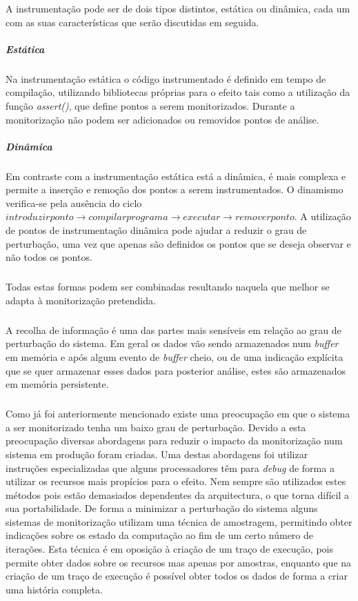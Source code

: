 \begin{itemize}
A instrumentação pode ser de dois tipos distintos, estática ou dinâmica, cada um com as suas características que serão discutidas em seguida.

\subparagraph*{Estática}

Na instrumentação estática o código instrumentado é definido em tempo de compilação, utilizando bibliotecas próprias para o efeito tais como a utilização da função \textit{assert()}, que define pontos a serem monitorizados. Durante a monitorização não podem ser adicionados ou removidos pontos de análise.

\subparagraph*{Dinâmica}

Em contraste com a instrumentação estática está a dinâmica, é mais complexa e permite a inserção e remoção dos pontos a serem instrumentados. O dinamismo verifica-se pela ausência do ciclo $introduzir ponto\rightarrow compilar programa\rightarrow executar\rightarrow remover ponto$. A utilização de pontos de instrumentação dinâmica pode ajudar a reduzir o grau de perturbação, uma vez que apenas são definidos os pontos que se deseja observar e não todos os pontos.
\end{itemize}
\subparagraph*{}
Todas estas formas podem ser combinadas resultando naquela que melhor se adapta à monitorização pretendida.

\subparagraph*{
}
A recolha de informação é uma das partes mais sensíveis em relação ao grau de perturbação do sistema. Em geral os dados vão sendo armazenados num \textit{buffer} em memória e após algum evento de \textit{buffer} cheio, ou de uma indicação explícita que se quer armazenar esses dados para posterior análise, estes são armazenados em memória persistente. 

\subparagraph*{
}
Como já foi anteriormente mencionado existe uma preocupação em que o sistema a ser monitorizado tenha um baixo grau de perturbação. Devido a esta preocupação diversas abordagens para reduzir o impacto da monitorização num sistema em produção foram criadas.
Uma destas abordagens foi utilizar instruções especializadas que alguns processadores têm para \textit{debug} de forma a utilizar os recursos mais propícios para o efeito. Nem sempre são utilizados estes métodos pois estão demasiados dependentes da arquitectura, o que torna difícil a sua portabilidade. De forma a minimizar a perturbação do sistema alguns sistemas de monitorização utilizam uma técnica de amostragem, permitindo obter indicações sobre os estado da computação ao fim de um certo número de iterações. Esta técnica é em oposição à criação de um traço de execução, pois permite obter dados sobre os recursos mas apenas por amostras, enquanto que na criação de um traço de execução é possível obter todos os dados de forma a criar uma história completa.

